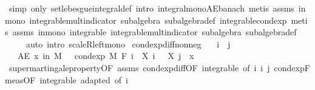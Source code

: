 \begin{isabellebody}
\ {\isacharparenleft}{\kern0pt}simp\ only{\isacharcolon}{\kern0pt}\ set{\isacharunderscore}{\kern0pt}lebesgue{\isacharunderscore}{\kern0pt}integral{\isacharunderscore}{\kern0pt}def{\isacharcomma}{\kern0pt}\ intro\ integral{\isacharunderscore}{\kern0pt}mono{\isacharunderscore}{\kern0pt}AE{\isacharunderscore}{\kern0pt}banach{\isacharcomma}{\kern0pt}\ metis\ assms{\isacharparenleft}{\kern0pt}{}{\isacharparenright}{\kern0pt}\ in{\isacharunderscore}{\kern0pt}mono\ integrable{\isacharunderscore}{\kern0pt}mult{\isacharunderscore}{\kern0pt}indicator\ subalgebra\ subalgebra{\isacharunderscore}{\kern0pt}def\ integrable{\isacharunderscore}{\kern0pt}cond{\isacharunderscore}{\kern0pt}exp{\isacharcomma}{\kern0pt}\ metis\ assms{\isacharparenleft}{\kern0pt}{}{\isacharparenright}{\kern0pt}\ in{\isacharunderscore}{\kern0pt}mono\ integrable\ integrable{\isacharunderscore}{\kern0pt}mult{\isacharunderscore}{\kern0pt}indicator\ subalgebra\ subalgebra{\isacharunderscore}{\kern0pt}def{\isacharparenright}{\kern0pt}\isanewline
\ \ \ \ \ {\isacharparenleft}{\kern0pt}auto\ intro{\isacharcolon}{\kern0pt}\ scaleR{\isacharunderscore}{\kern0pt}left{\isacharunderscore}{\kern0pt}mono{\isacharparenright}{\kern0pt}%
\endisatagproof
{\isafoldproof}%
%
\isadelimproof
\isanewline
%
\endisadelimproof
\isanewline
{}\isamarkupfalse%
\ cond{\isacharunderscore}{\kern0pt}exp{\isacharunderscore}{\kern0pt}diff{\isacharunderscore}{\kern0pt}nonneg{\isacharcolon}{\kern0pt}\isanewline
\ \ \ {\isachardoublequoteopen}i\ {\isasymle}\ j{\isachardoublequoteclose}\isanewline
\ \ \ {\isachardoublequoteopen}AE\ x\ in\ M{\isachardot}{\kern0pt}\ {}\ {\isasymle}\ cond{\isacharunderscore}{\kern0pt}exp\ M\ {\isacharparenleft}{\kern0pt}F\ i{\isacharparenright}{\kern0pt}\ {\isacharparenleft}{\kern0pt}{\isasymlambda}{\isasymxi}{\isachardot}{\kern0pt}\ X\ i\ {\isasymxi}\ {\isacharminus}{\kern0pt}\ X\ j\ {\isasymxi}{\isacharparenright}{\kern0pt}\ x{\isachardoublequoteclose}\isanewline
%
\isadelimproof
\ \ %
\endisadelimproof
%
\isatagproof
{}\isamarkupfalse%
\ supermartingale{\isacharunderscore}{\kern0pt}property{\isacharbrackleft}{\kern0pt}OF\ assms{\isacharbrackright}{\kern0pt}\ cond{\isacharunderscore}{\kern0pt}exp{\isacharunderscore}{\kern0pt}diff{\isacharbrackleft}{\kern0pt}OF\ integrable{\isacharparenleft}{\kern0pt}{}{\isacharcomma}{\kern0pt}{}{\isacharparenright}{\kern0pt}{\isacharcomma}{\kern0pt}\ of\ i\ i\ j{\isacharbrackright}{\kern0pt}\ cond{\isacharunderscore}{\kern0pt}exp{\isacharunderscore}{\kern0pt}F{\isacharunderscore}{\kern0pt}meas{\isacharbrackleft}{\kern0pt}OF\ integrable\ adapted{\isacharcomma}{\kern0pt}\ of\ i{\isacharbrackright}{\kern0pt}\ \isamarkupfalse%

\end{isabellebody}
